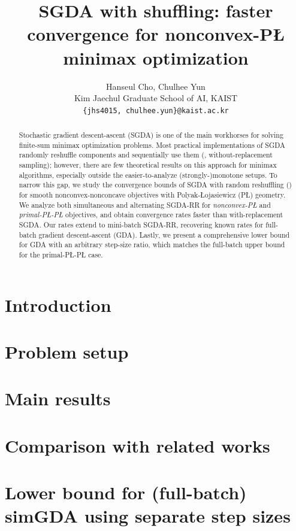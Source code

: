 \documentclass{article}
\title{SGDA with shuffling: faster convergence for nonconvex-P{\L} minimax optimization}
\author{Hanseul Cho, Chulhee Yun \\
Kim Jaechul Graduate School of AI, KAIST\\
\texttt{\{jhs4015, chulhee.yun\}@kaist.ac.kr} \\
}
\begin{document}
\maketitle

\begin{abstract}
Stochastic gradient descent-ascent (SGDA) is one of the main workhorses for solving finite-sum minimax optimization problems. Most practical implementations of SGDA randomly reshuffle components and sequentially use them (\ie, without-replacement sampling); however, there are few theoretical results on this approach for minimax algorithms, especially outside the easier-to-analyze (strongly-)monotone setups. To narrow this gap, we study the convergence bounds of SGDA with random reshuffling () for smooth nonconvex-nonconcave objectives with Polyak-{\L}ojasiewicz (P{\L}) geometry. We analyze both simultaneous and alternating SGDA-RR for \emph{nonconvex-P{\L}} and \emph{primal-P{\L}-P{\L}} objectives, and obtain convergence rates faster than with-replacement SGDA. Our rates extend to mini-batch SGDA-RR, recovering known rates for full-batch gradient descent-ascent (GDA). Lastly, we present a comprehensive lower bound for GDA with an arbitrary step-size ratio, which matches the full-batch upper bound for the primal-P{\L}-P{\L} case.
\end{abstract}

\section{Introduction}
\label{sec:intro}


\section{Problem setup}
\label{sec:setup}


\section{Main results}
\label{sec:main results}


\section{Comparison with related works}
\label{sec:discussion}


\section{Lower bound for (full-batch) simGDA using separate step sizes}
\label{sec:LB GDA}

\end{document}
